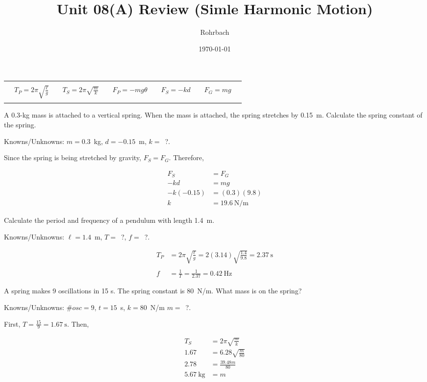 \documentclass[10pt]{exam}
\title{Unit 08(A) Review (Simle Harmonic Motion)}
\author{Rohrbach}
\date{\today}
\newcommand{\printeqs}{
  \ifprintanswers
  \else
    \begin{center}
      \begin{tabular}{|*{11}{c}|}
        \hline 
        &&&&&&&&&&\\
        &
        $T_P=2\pi\sqrt{\frac{\ell}{g}}$ &&
        $T_S=2\pi\sqrt{\frac{m}{k}}$ &&
        $F_P=-mg\theta$ &&
        $F_S=-kd$ &&
        $F_G=mg$ &\\
        &&&&&&&&&&\\
        \hline
      \end{tabular}
    \end{center}
  \fi
}
\begin{document}
\maketitle

\printeqs

\begin{questions}


\question
  A 0.3-kg mass is attached to a vertical spring. When the mass is attached, the spring stretches by 0.15~m. Calculate the spring constant of the spring.

  \begin{solution}[\stretch{1}]
    Knowns/Unknowns: $m=0.3$~kg, $d=-0.15$~m, $k=$~?.

    Since the spring is being stretched by gravity, $F_S=F_G$.  Therefore,

    \begin{align*}
      F_S &= F_G \\
      -kd &= mg  \\
      -k(-0.15) &= (0.3)(9.8) \\
      k &= \SI{19.6}{\newton\per\meter}
    \end{align*}

  \end{solution}

\question
  Calculate the period and frequency of a pendulum with length 1.4~m.

  \begin{solution}[\stretch{1}]
    Knowns/Unknowns: $\ell=1.4$~m, $T=$~?, $f=$~?.

    \begin{align*}
      T_P &= 2\pi \sqrt{\frac{\ell}{g}} 
            = 2(3.14) \sqrt{\frac{1.4}{9.8}} 
            = \SI{2.37}{\second} \\\\
      f   &= \frac{1}{T} = \frac{1}{2.37} = \SI{0.42}{\hertz}
    \end{align*}

  \end{solution}

\question
  A spring makes 9 oscillations in 15 s. The spring constant is 80~N/m.  What mass is on the spring?
  
  \begin{solution}[\stretch{1}]
    Knowns/Unknowns: $\#osc=9$, $t=15$~s, $k=80$~N/m $m=$~?.
    
    First, $T = \frac{15}{9} = \SI{1.67}{\second}$.  Then,
    
    \begin{align*} 
      T_S  &= 2\pi \sqrt{\frac{m}{k}} \\
      1.67 &= 6.28 \sqrt{\frac{m}{80}}\\
      2.78 &= \frac{39.48m}{80} \\
      \SI{5.67}{\kilo\gram} &= m
    \end{align*}
  \end{solution}


\end{questions}
\end{document}
